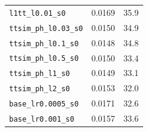 \begin{table}[h]
\begin{tabular}{lrr}
\texttt{l1tt\_l0.01\_s0} & 0.0169 & 35.9 \\
\texttt{ttsim\_ph\_l0.03\_s0} & 0.0150 & 34.9 \\
\texttt{ttsim\_ph\_l0.1\_s0} & 0.0148 & 34.8 \\
\texttt{ttsim\_ph\_l0.5\_s0} & 0.0150 & 33.4 \\
\texttt{ttsim\_ph\_l1\_s0} & 0.0149 & 33.1 \\
\texttt{ttsim\_ph\_l2\_s0} & 0.0153 & 32.0 \\
\texttt{base\_lr0.0005\_s0} & 0.0171 & 32.6 \\
\texttt{base\_lr0.001\_s0} & 0.0157 & 33.6 \\
\bottomrule
\end{tabular}
\end{table}
